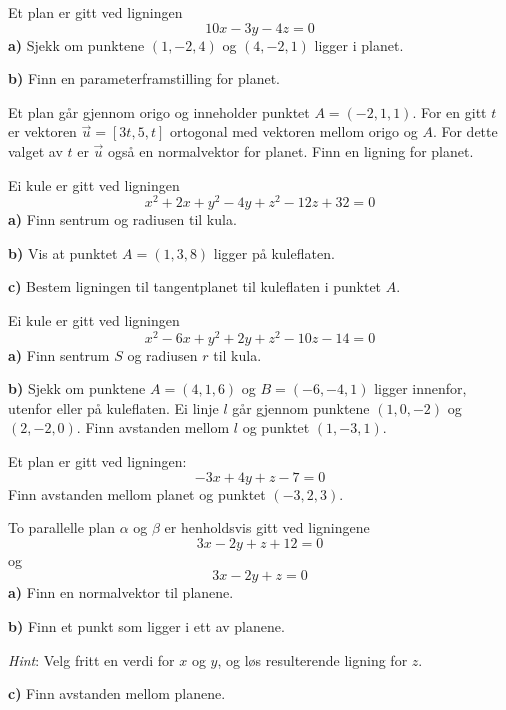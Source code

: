 Et plan er gitt ved ligningen
\[ 10x-3y-4z=0 \]
\textbf{a)} Sjekk om punktene $ (1, -2, 4) $ og $ (4, -2, 1) $ ligger i planet.\os

\textbf{b)} Finn en parameterframstilling for planet.

Et plan går gjennom origo og inneholder punktet $ A=(-2, 1, 1) $. For en gitt $ t $ er vektoren $ \vec{u}=[3t, 5, t] $ ortogonal med vektoren mellom origo og $ A $. For dette valget av $ t $ er $ \vec{u} $ også en normalvektor for planet. Finn en ligning for planet.

Ei kule er gitt ved ligningen
\[ x^2 + 2 x + y^2 - 4 y + z^2 - 12 z + 32 = 0  \]
\textbf{a)} Finn sentrum og radiusen til kula.\os

\textbf{b)} Vis at punktet $ A=(1, 3, 8) $ ligger på kuleflaten.\os

\textbf{c)} Bestem ligningen til tangentplanet til kuleflaten i punktet $ A $. 

Ei kule er gitt ved ligningen 
\[ x^2 - 6x + y^2 + 2y + z^2 - 10z-14=0 \]
\textbf{a)} Finn sentrum $ S $ og radiusen $ r $ til kula.\os

\textbf{b)} Sjekk om punktene $ A= (4, 1, 6) $ og $ B=(-6, -4, 1) $ ligger innenfor, utenfor eller på kuleflaten.
\newpage
\nes
{} Ei linje $ l $ går gjennom punktene $ (1, 0, -2) $ og $ (2, -2,0) $. Finn avstanden mellom $ l $ og punktet $ (1, -3, 1) $. 

Et plan er gitt ved ligningen:
\[ -3x+4y+z-7 = 0 \]
Finn avstanden mellom planet og punktet $ (-3,2,3) $.

To parallelle plan $ \alpha $ og $ \beta $ er henholdsvis gitt ved ligningene 
\[ 3x -2y +z +12 = 0 \]
og 
\[ 3x -2y +z = 0  \]
\textbf{a)} Finn en normalvektor til planene.\os

\textbf{b)} Finn et punkt som ligger i ett av planene. \os

\textsl{Hint}: Velg fritt en verdi for $ x $ og $ y $, og løs resulterende ligning for $ z $.\os

\textbf{c)} Finn avstanden mellom planene.\os

